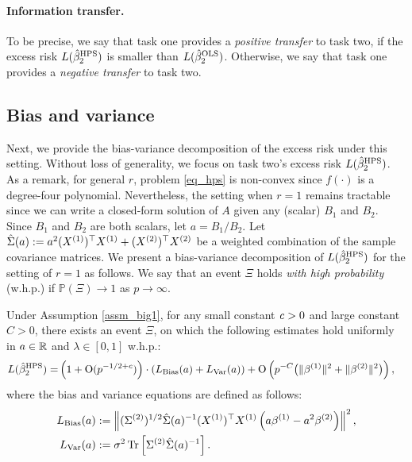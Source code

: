 \paragraph{Information transfer.} To be precise, we say that task one provides a \textit{positive transfer} to task two, if the excess risk $L(\hat{\beta}_2^{\textup{HPS}})$ is smaller than $L(\hat{\beta}_2^{\textup{OLS}})$.
Otherwise, we say that task one provides a \textit{negative transfer} to task two.

\subsection{Bias and variance}\label{sec_bv}


Next, we provide the bias-variance decomposition of the excess risk under this setting.
Without loss of generality, we focus on task two's excess risk $L(\hat{\beta}^{\textup{HPS}}_2)$.
As a remark, for general $r$, problem \eqref{eq_hps} is non-convex since $f(\cdot)$ is a degree-four polynomial.
Nevertheless, the setting when $r = 1$ remains tractable since we can write a closed-form solution of $A$ given any (scalar) $B_1$ and $B_2$.
Since $B_1$ and $B_2$ are both scalars, let $a = B_1 / B_2$.
Let $\hat{\Sigma}(a) := a^2 (X^{(1)})^{\top} X^{(1)} + (X^{(2)})^{\top} X^{(2)}$ be a weighted combination of the sample covariance matrices.
We present a bias-variance decomposition of $L(\hat{\beta}^{\textup{HPS}}_2)$ for the setting of $r = 1$ as follows.
We say that an event $\Xi$ holds \emph{with high probability} (w.h.p.) if $\mathbb P(\Xi)\to 1$ as $p\to \infty$.

\begin{proposition}\label{lem_HPS_loss}
     Under Assumption \ref{assm_big1}, for any small constant ${\mathit{c}}>0$ and large constant $C>0$, there exists an event $\Xi$, on which the following estimates hold uniformly in $a\in \mathbb{R}$ and $\lambda\in [0,1]$ w.h.p.:
    \begin{align}
        L(\hat{\beta}_2^{\MTL}) =& \left( 1+ \OO(p^{-1/2+c})\right)\cdot \left(L_{\bias} (a) + L_{\var}(a)\right) %
        + \OO \left( p^{-C}\big( \|\beta^{(1)} \|^2  +  \|\beta^{(2)} \|^2\big)   \right), \label{L_HPS_simple}
    \end{align}
    where the bias and variance equations are defined as follows:
    \begin{align}
        L_{\textup{Bias}} (a) &:= \left\| (\Sigma^{(2)})^{1/2}\hat \Sigma(a)^{-1} (X^{(1)})^\top X^{(1)} \left(a\beta^{(1)}- a^2\beta^{(2)}\right) \right\|^2,  \label{Lbias} \\
        L_{\operatorname{Var}}(a)   &:= \sigma^2  \operatorname{Tr}\left[{\Sigma^{(2)}\hat \Sigma(a)^{-1}  }\right].  \label{Lvar}
    \end{align}
\end{proposition}



